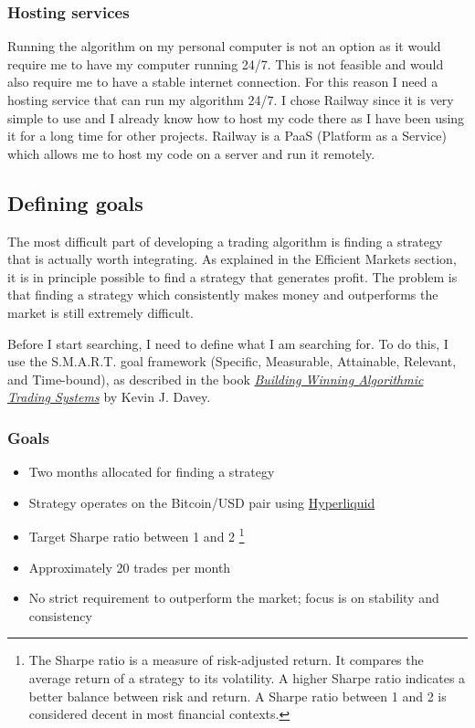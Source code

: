 \documentclass[12pt]{article}
\begin{document}
\subsubsection*{Hosting services}
Running the algorithm on my personal computer is not an option as it would require me to have my computer running 24/7. This is not feasible and would also require me to have a stable internet connection. For this reason I need a hosting service that can run my algorithm 24/7. I chose Railway since it is very simple to use and I already know how to host my code there as I have been using it for a long time for other projects. Railway is a PaaS (Platform as a Service) which allows me to host my code on a server and run it remotely.










\newpage
\subsection*{Defining goals}


The most difficult part of developing a trading algorithm is finding a strategy that is actually worth integrating. As explained in the Efficient Markets section, it is in principle possible to find a strategy that generates profit. The problem is that finding a strategy which consistently makes money and outperforms the market is still extremely difficult.

Before I start searching, I need to define what I am searching for. To do this, I use the S.M.A.R.T. goal framework (Specific, Measurable, Attainable, Relevant, and Time-bound), as described in the book \href{https://www.amazon.com/Building-Winning-Algorithmic-Trading-Systems/dp/1118778987}{\textit{Building Winning Algorithmic Trading Systems}} by Kevin J. Davey.

\subsubsection*{Goals}
\begin{itemize}
    \item Two months allocated for finding a strategy
    \item Strategy operates on the Bitcoin/USD pair using \href{https://hyperfoundation.org/}{Hyperliquid}
    \item Target Sharpe ratio between 1 and 2 \footnote{The Sharpe ratio is a measure of risk-adjusted return. It compares the average return of a strategy to its volatility. A higher Sharpe ratio indicates a better balance between risk and return. A Sharpe ratio between 1 and 2 is considered decent in most financial contexts.}
    \item Approximately 20 trades per month
    \item No strict requirement to outperform the market; focus is on stability and consistency
\end{itemize}
\end{document}
